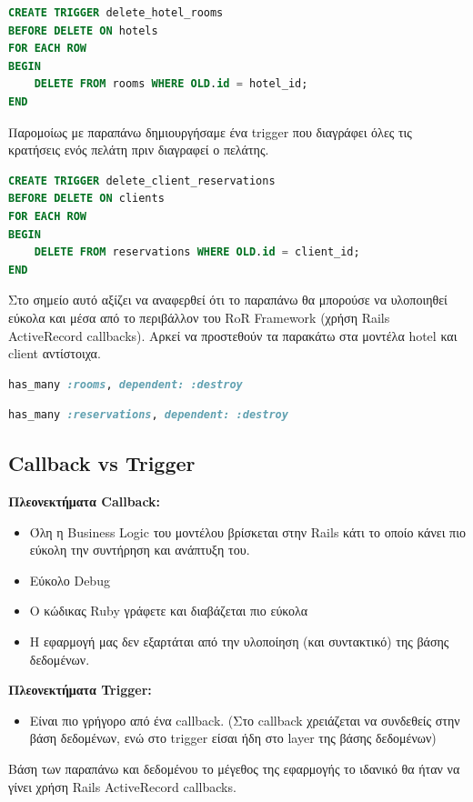 \documentclass[a4paper,12pt]{article}
\begin{document}
\begin{lstlisting}[language=SQL]
CREATE TRIGGER delete_hotel_rooms
BEFORE DELETE ON hotels 
FOR EACH ROW
BEGIN
	DELETE FROM rooms WHERE OLD.id = hotel_id;
END
\end{lstlisting}

Παρομοίως με παραπάνω δημιουργήσαμε ένα trigger που διαγράφει όλες τις κρατήσεις ενός πελάτη πριν διαγραφεί ο πελάτης.

\begin{lstlisting}[language=SQL]
CREATE TRIGGER delete_client_reservations
BEFORE DELETE ON clients 
FOR EACH ROW
BEGIN
	DELETE FROM reservations WHERE OLD.id = client_id;
END
\end{lstlisting}

Στο σημείο αυτό αξίζει να αναφερθεί ότι το παραπάνω θα μπορούσε να υλοποιηθεί εύκολα και μέσα από το περιβάλλον του RoR Framework (χρήση Rails ActiveRecord callbacks). Αρκεί να προστεθούν τα παρακάτω στα μοντέλα hotel και client αντίστοιχα.

\begin{lstlisting}[language=Ruby]
has_many :rooms, dependent: :destroy
\end{lstlisting}

\begin{lstlisting}[language=Ruby]
has_many :reservations, dependent: :destroy
\end{lstlisting}

\subsection{Callback vs Trigger}
	\textbf{Πλεονεκτήματα Callback:}
	\begin{itemize}
	  \item Όλη η Business Logic του μοντέλου βρίσκεται στην Rails κάτι το οποίο κάνει πιο εύκολη την συντήρηση και ανάπτυξη του.
	  \item Εύκολο Debug
	  \item Ο κώδικας Ruby γράφετε και διαβάζεται πιο εύκολα
	  \item Η εφαρμογή μας δεν εξαρτάται από την υλοποίηση (και συντακτικό) της βάσης δεδομένων.
	\end{itemize}
	\textbf{Πλεονεκτήματα Trigger:}
	\begin{itemize}
	  \item Είναι πιο γρήγορο από ένα callback. (Στο callback χρειάζεται να συνδεθείς στην βάση δεδομένων, ενώ στο trigger είσαι ήδη στο layer της βάσης δεδομένων)
	\end{itemize}
	Βάση των παραπάνω και δεδομένου το μέγεθος της εφαρμογής το ιδανικό θα ήταν να γίνει χρήση Rails ActiveRecord callbacks.
\end{document}
